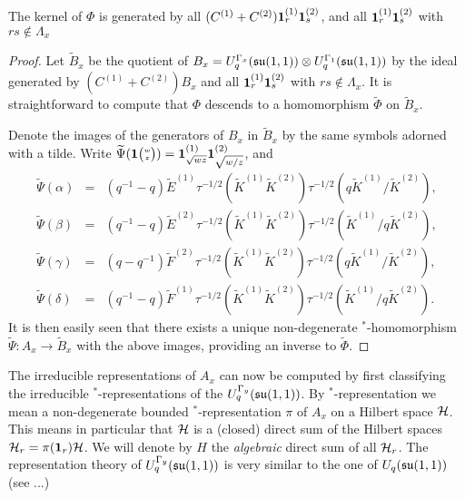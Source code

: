 \begin{Lem}\label{LemKer} The kernel of $\Phi$ is generated by all $(C^{(1)}+C^{(2)})\mathbf{1}_r^{(1)}\mathbf{1}_s^{(2)}$, and all $\mathbf{1}_r^{(1)}\mathbf{1}_s^{(2)}$ with $rs\notin \Lambda_x$
\end{Lem} 
\begin{proof} Let $\widetilde{B}_x$ be the quotient of $B_x = U_q^{\Gamma_x}(\mathfrak{su}(1,1))\otimes U_q^{\Gamma_1}(\mathfrak{su}(1,1))$ by the ideal generated by $(C^{(1)}+C^{(2)})B_x$ and all $\mathbf{1}_r^{(1)}\mathbf{1}_s^{(2)}$ with $rs\notin \Lambda_x$. It is straightforward to compute that $\Phi$ descends to a homomorphism $\widetilde{\Phi}$ on $\widetilde{B}_x$. 

Denote the images of the generators of $B_x$ in $\widetilde{B}_x$ by the same symbols adorned with a tilde. Write $\widetilde{\Psi}(\mathbf{1}{\tiny {\begin{pmatrix} w\\z\end{pmatrix}}}) = \mathbf{1}_{\sqrt{wz}}^{(1)}\mathbf{1}_{\sqrt{w/z}}^{(2)}$, and \begin{eqnarray*} 
\widetilde{\Psi}(\alpha) &=& (q^{-1}-q)\widetilde{E}^{(1)}\tau^{-1/2}(\widetilde{K}^{(1)}\widetilde{K}^{(2)})\tau^{-1/2}(q\widetilde{K}^{(1)}/\widetilde{K}^{(2)}),\\ 
\widetilde{\Psi}(\beta) &=& (q^{-1}-q)\widetilde{E}^{(2)}\tau^{-1/2}(\widetilde{K}^{(1)}\widetilde{K}^{(2)})\tau^{-1/2}(\widetilde{K}^{(1)}/q\widetilde{K}^{(2)}),\\ 
\widetilde{\Psi}(\gamma) &=& (q-q^{-1})\widetilde{F}^{(2)}\tau^{-1/2}(\widetilde{K}^{(1)}\widetilde{K}^{(2)})\tau^{-1/2}(q\widetilde{K}^{(1)}/\widetilde{K}^{(2)}),\\
\widetilde{\Psi}(\delta) &=&  (q^{-1}-q)\widetilde{F}^{(1)}\tau^{-1/2}(\widetilde{K}^{(1)}\widetilde{K}^{(2)})\tau^{-1/2}(\widetilde{K}^{(1)}/q\widetilde{K}^{(2)}).
\end{eqnarray*}
It is then easily seen that there exists a unique non-degenerate $^*$-homomorphism $\widetilde{\Psi}: A_x\rightarrow \widetilde{B}_x$ with the above images, providing an inverse to $\widetilde{\Phi}$.
\end{proof}

The irreducible representations of $A_x$ can now be computed by first classifying the irreducible $^*$-representations of the $U_q^{\Gamma_y}(\mathfrak{su}(1,1))$. By $^*$-representation we mean a non-degenerate bounded $^*$-representation $\pi$ of $A_x$ on a Hilbert space $\mathcal{H}$. This means in particular that $\mathcal{H}$ is a (closed) direct sum of the Hilbert spaces $\mathcal{H}_r = \pi(\mathbf{1}_r)\mathcal{H}$. We will denote by $H$ the \emph{algebraic} direct sum of all $\mathcal{H}_r$. The representation theory of $U_q^{\Gamma_y}(\mathfrak{su}(1,1))$ is very similar to the one of $U_q(\mathfrak{su}(1,1))$ (see ...)

